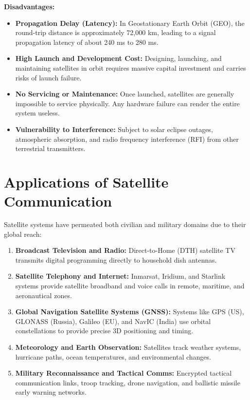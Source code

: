 \documentclass[12pt,a4paper]{article}
\begin{document}
\textbf{Disadvantages:}
\begin{itemize}[leftmargin=*, itemsep=3pt]
  \item \textbf{Propagation Delay (Latency):} In Geostationary Earth Orbit (GEO), the round-trip distance is approximately 72,000 km, leading to a signal propagation latency of about 240 ms to 280 ms.
  \item \textbf{High Launch and Development Cost:} Designing, launching, and maintaining satellites in orbit requires massive capital investment and carries risks of launch failure.
  \item \textbf{No Servicing or Maintenance:} Once launched, satellites are generally impossible to service physically. Any hardware failure can render the entire system useless.
  \item \textbf{Vulnerability to Interference:} Subject to solar eclipse outages, atmospheric absorption, and radio frequency interference (RFI) from other terrestrial transmitters.
\end{itemize}

\section{Applications of Satellite Communication}

Satellite systems have permeated both civilian and military domains due to their global reach:

\begin{enumerate}[label=\textbf{\arabic*.}, leftmargin=*, itemsep=4pt]
  \item \textbf{Broadcast Television and Radio:} Direct-to-Home (DTH) satellite TV transmits digital programming directly to household dish antennas.
  \item \textbf{Satellite Telephony and Internet:} Inmarsat, Iridium, and Starlink systems provide satellite broadband and voice calls in remote, maritime, and aeronautical zones.
  \item \textbf{Global Navigation Satellite Systems (GNSS):} Systems like GPS (US), GLONASS (Russia), Galileo (EU), and NavIC (India) use orbital constellations to provide precise 3D positioning and timing.
  \item \textbf{Meteorology and Earth Observation:} Satellites track weather systems, hurricane paths, ocean temperatures, and environmental changes.
  \item \textbf{Military Reconnaissance and Tactical Comms:} Encrypted tactical communication links, troop tracking, drone navigation, and ballistic missile early warning networks.
\end{enumerate}
\end{document}
